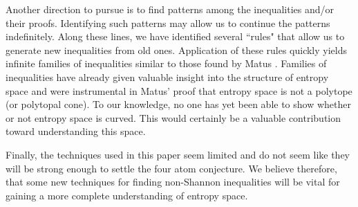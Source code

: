 \documentclass[10pt,journal]{IEEEtran}
\begin{document}
Another direction to pursue is to find patterns among the inequalities and/or their proofs.
Identifying such patterns may allow us to continue the patterns indefinitely.  Along these lines,
we have identified several ``rules" that allow us to generate new inequalities from old ones.
Application of these rules quickly yields infinite families of inequalities similar to those
found by Matus \cite{Matus}.  Families of inequalities have already given valuable insight into
the structure of entropy space and were instrumental in Matus' proof that entropy space is not a polytope (or polytopal cone).
To our knowledge, no one has yet been able to show whether or not entropy space is curved.
This would certainly be a valuable contribution toward understanding this space.

Finally, the techniques used in this paper seem limited and do not seem like they will be strong enough
to settle the four atom conjecture.  We believe therefore, that some new techniques for
finding non-Shannon inequalities will be vital for gaining a more complete understanding of entropy space.


\renewcommand{\baselinestretch}{1.0}
\end{document}
